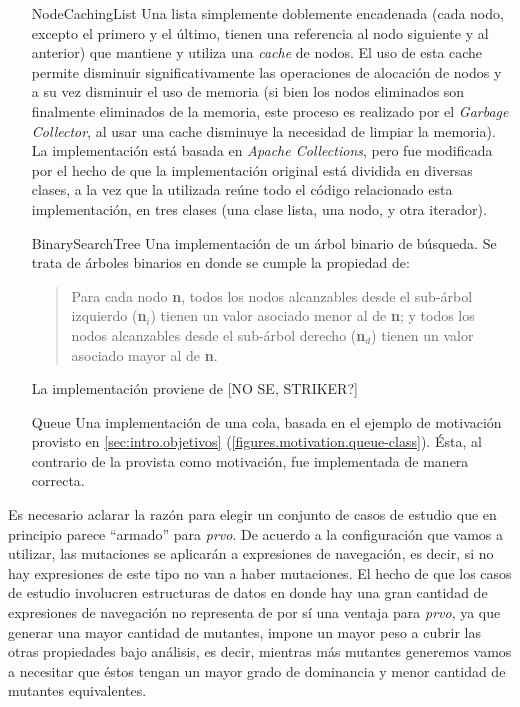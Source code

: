 \begin{enumerate}[leftmargin=.75cm,align=left,style=nextline]
	\item[NodeCachingList] Una lista simplemente doblemente encadenada (cada nodo, excepto el primero y el \'ultimo, tienen una referencia al nodo siguiente y al anterior) que mantiene y utiliza una \emph{cache} de nodos. El uso de esta cache permite disminuir significativamente las operaciones de alocaci\'on de nodos y a su vez disminuir el uso de memoria (si bien los nodos eliminados son finalmente eliminados de la memoria, este proceso es realizado por el \emph{Garbage Collector}, al usar una cache disminuye la necesidad de limpiar la memoria). La implementaci\'on est\'a basada en \emph{Apache Collections}, pero fue modificada por el hecho de que la implementaci\'on original est\'a dividida en diversas clases, a la vez que la utilizada re\'une todo el c\'odigo relacionado esta implementaci\'on, en tres clases (una clase lista, una nodo, y otra iterador).
	
	\item[BinarySearchTree] Una implementaci\'on de un \'arbol binario de b\'usqueda. Se trata de \'arboles binarios en donde se cumple la propiedad de:
	\begin{quote}
		Para cada nodo \textbf{n}, todos los nodos alcanzables desde el sub-\'arbol izquierdo (\textbf{n$_i$}) tienen un valor asociado menor al de \textbf{n}; y todos los nodos alcanzables desde el sub-\'arbol derecho (\textbf{n$_d$}) tienen un valor asociado mayor al de \textbf{n}.
	\end{quote}
	La implementaci\'on proviene de [NO SE, STRIKER?]
	
	\item[Queue] Una implementaci\'on de una cola, basada en el ejemplo de motivaci\'on provisto en \ref{sec:intro.objetivos} (\ref{figures.motivation.queue-class}). \'Esta, al contrario de la provista como motivaci\'on, fue implementada de manera correcta.
	
\end{enumerate}

Es necesario aclarar la raz\'on para elegir un conjunto de casos de estudio que en principio parece ``armado'' para \emph{prvo}. De acuerdo a la configuraci\'on que vamos a utilizar, las mutaciones se aplicar\'an a expresiones de navegaci\'on, es decir, si no hay expresiones de este tipo no van a haber mutaciones. El hecho de que los casos de estudio involucren estructuras de datos en donde hay una gran cantidad de expresiones de navegaci\'on no representa de por s\'i una ventaja para \emph{prvo}, ya que generar una mayor cantidad de mutantes, impone un mayor peso a cubrir las otras propiedades bajo an\'alisis, es decir, mientras m\'as mutantes generemos vamos a necesitar que \'estos tengan un mayor grado de dominancia y menor cantidad de mutantes equivalentes.

